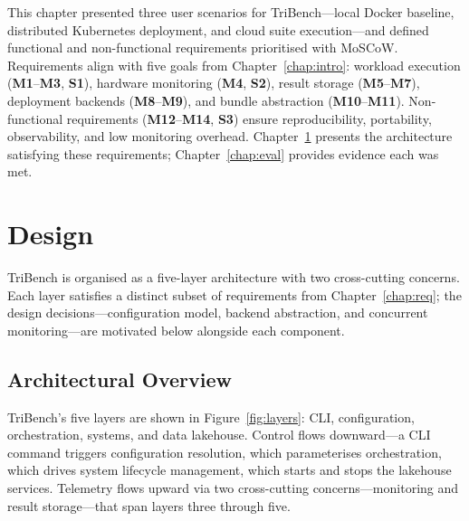 \documentclass{l4proj}
\begin{document}
This chapter presented three user scenarios for TriBench---local Docker baseline, distributed Kubernetes deployment, and cloud suite execution---and defined functional and non-functional requirements prioritised with MoSCoW. Requirements align with five goals from Chapter~\ref{chap:intro}: workload execution (\textbf{M1}--\textbf{M3}, \textbf{S1}), hardware monitoring (\textbf{M4}, \textbf{S2}), result storage (\textbf{M5}--\textbf{M7}), deployment backends (\textbf{M8}--\textbf{M9}), and bundle abstraction (\textbf{M10}--\textbf{M11}). Non-functional requirements (\textbf{M12}--\textbf{M14}, \textbf{S3}) ensure reproducibility, portability, observability, and low monitoring overhead. Chapter~\ref{chap:design} presents the architecture satisfying these requirements; Chapter~\ref{chap:eval} provides evidence each was met.




\chapter{Design}
\label{chap:design}
TriBench is organised as a five-layer architecture with two cross-cutting concerns. Each layer satisfies a distinct subset of requirements from Chapter~\ref{chap:req}; the design decisions---configuration model, backend abstraction, and concurrent monitoring---are motivated below alongside each component.

\section{Architectural Overview}
\label{sec:arch_overview}

TriBench's five layers are shown in Figure~\ref{fig:layers}: CLI, configuration, orchestration, systems, and data lakehouse. Control flows downward---a CLI command triggers configuration resolution, which parameterises orchestration, which drives system lifecycle management, which starts and stops the lakehouse services. Telemetry flows upward via two cross-cutting concerns---monitoring and result storage---that span layers three through five.

\end{document}
